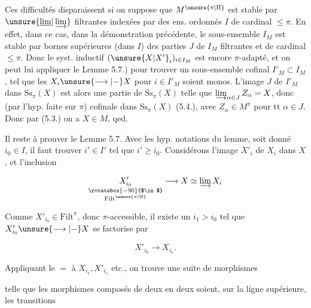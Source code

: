 Ces difficultés disparaissent si on suppose que $M^{\unsure{\pi|\Pi}}$ est stable par $\unsure{\underline{\lim}|\varinjlim}$ filtrantes indexées par des ens.  ordonnés $I$ de cardinal $\leq\pi$. En effet, dans ce cas,  dans la démonstration précédente, le sous-ensemble $I_M$ est stable par bornes supérieures (dans $I$) des parties $J$ de $I_M$ filtrantes et de cardinal $\leq\pi$. Donc le syst. inductif $(\unsure{X|X'}_i)_{i\in I_M}$ est encore $\pi$-adapté, et on peut lui appliquer le Lemme 5.7.) pour trouver un sous-ensemble cofinal $I'_M\subset I_M$, tel que les $X_i\unsure{\longrightarrow|-} X$ pour $i\in I'_M$ soient monos. L'image $J$ de $I'_M$ dans $\mathrm{Ss}_{\pi}(X)$ est alors une partie de $\mathrm{Ss}_{\pi}(X)$ telle que $\varinjlim_{\alpha\in J} Z_\alpha=X$, donc (par l'hyp. faite sur $\pi$) cofinale dans $\mathrm{Ss}_{\pi}(X)$ (5.4.), avec $Z_\alpha\in M^\pi$  pour tt $\alpha\in J$. Donc par (5.3.) on a $X\in M$, qed.


Il reste à prouver le Lemme 5.7.  Avec les hyp.  notations du lemme, soit donné $i_0\in I$, il faut trouver $i'\in I'$ tel que $i'\geq i_0$. Considérons l'image $X'_i$ de $X_i$ dans $X$, et l'inclusion

\[
\underset{\substack{\rotatebox{-90}{$\in$}\\\mathrm{Filt}^{\unsure{\pi|\Pi}}}}{X'_{i_0}}\longrightarrow X\simeq\varinjlim X_i
\]

Comme $X'_{i_0}\in\mathrm{Filt}^\pi$, donc  $\pi$-accessible, il existe un $i_1>i_0$ tel que $X'_{i_0}\unsure{\longrightarrow|-} X$ se factorise par

\[
X'_{i_0}\longrightarrow X_{i_1}.
\]

Appliquant le $=$  à $X_{i_1},X'_{i_1}$ etc., on trouve une suite  de morphismes


telle que les morphismes composés de deux en deux soient,  sur la ligne supérieure, les transitions

